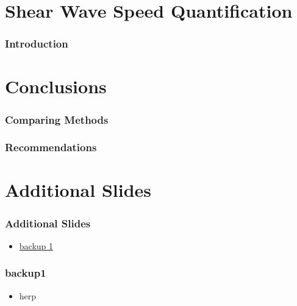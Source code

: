 \documentclass{beamer}
\begin{document}
	\section[Shear]{Shear Wave Speed Quantification}
		\begin{frame}
			\frametitle{Introduction}
		\end{frame}

	\section{Conclusions}
		\begin{frame}
			\frametitle{Comparing Methods}
		\end{frame}
		\begin{frame}
			\frametitle{Recommendations}
		\end{frame}

	\appendix
	\section{Additional Slides}
	\setcounter{showProgressBar}{0}
	\setcounter{showSlideNumbers}{0}

		\begin{frame}
			\frametitle{Additional Slides}
			\begin{itemize}
				\item \hyperlink{backup1}{backup 1}
			\end{itemize}
		\end{frame}

		\begin{frame}[label=backup1]
			\frametitle{backup1}
			\begin{itemize}
				\item herp
			\end{itemize}
		\end{frame}
\end{document}
